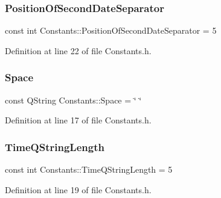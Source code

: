 \hypertarget{classConstants_a6d9e83adc428b25381bc25b2e38843ea}{}\label{classConstants_a6d9e83adc428b25381bc25b2e38843ea} 
\subsubsection{\texorpdfstring{Position\+Of\+Second\+Date\+Separator}{PositionOfSecondDateSeparator}}
{\footnotesize\ttfamily const int Constants\+::\+Position\+Of\+Second\+Date\+Separator = 5\hspace{0.3cm}{\ttfamily [static]}}



Definition at line 22 of file Constants.\+h.

\hypertarget{classConstants_ade4aef58a5c7280c4f0bd40ba7b30f3c}{}\label{classConstants_ade4aef58a5c7280c4f0bd40ba7b30f3c} 
\subsubsection{\texorpdfstring{Space}{Space}}
{\footnotesize\ttfamily const Q\+String Constants\+::\+Space = \char`\"{} \char`\"{}\hspace{0.3cm}{\ttfamily [static]}}



Definition at line 17 of file Constants.\+h.

\hypertarget{classConstants_a577e140cbb46e0fe143af8c18c29cee1}{}\label{classConstants_a577e140cbb46e0fe143af8c18c29cee1} 
\subsubsection{\texorpdfstring{Time\+Q\+String\+Length}{TimeQStringLength}}
{\footnotesize\ttfamily const int Constants\+::\+Time\+Q\+String\+Length = 5\hspace{0.3cm}{\ttfamily [static]}}



Definition at line 19 of file Constants.\+h.

\hypertarget{classConstants_aa6a4e4e111634badc8b8aeba9df024ce}{}\label{classConstants_aa6a4e4e111634badc8b8aeba9df024ce} 
